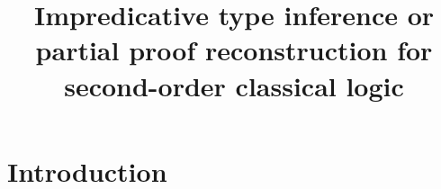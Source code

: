 \documentclass{amsart}
\title
[Impredicative type inference]
{
Impredicative type inference
\break
or
\break
partial proof reconstruction \break
for second-order classical logic
}
\begin{document}
\newcommand{\nc}{\newcommand}
\newcommand{\DotExpr}[2]{#1 #2.\ }
\nc\Abs    {\DotExpr\lambda}
\nc\All    {\DotExpr\forall}
\nc\Allin  {\forall\mathrm{in}}
\nc\Allex  {\forall\mathrm{ex}}
\nc\AbortCC{\mathrm{abort/cc}}
\nc\ApplyCC{\mathrm{apply/cc}}
\nc\Brouwer{\operatorname{Brouwer}}
\nc\Case   {}
\nc\Cps    {\operatorname{cps}}
\nc\Dn[1]  {(#1 \R \bot) \R \bot}
\nc\Dni    {\mathrm{\neg\neg I}}
\nc\Erase  {\mathrm{erase}}
\nc\Ex     {\DotExpr\exists}
\nc\Exin   {\exists\mathrm{in}}
\nc\Exex   {\exists\mathrm{ex}}
\nc\Exmid  {\text{excluded-middle}}
\nc\FV     {\operatorname{FV}}
\nc\Halt   {\mathrm{halt}}
\nc\Id     {\mathit{id}}
\nc\Indent {\hspace{3em}}
\nc\Mgsr   {\operatorname{mgsr}}
\nc\Or     {\ | \ }
\nc\Pack   {\mathrm{pack}}
\nc\Prune  {\operatorname{prune}}
\nc\Recall {\DotExpr\Xi} %
\nc\Redo   {\operatorname{redo}}
\nc\Tabs   {\DotExpr\Lambda}
\nc\Tech   {\text{technical}}
\nc\R      {\rightarrow}
\nc\Unpack {\mathrm{unpack}}
\nc\Undo   {\operatorname{undo}}
\nc\Unify  {\operatorname{unify}}
\maketitle
\tableofcontents

\section{Introduction}
\end{document}
